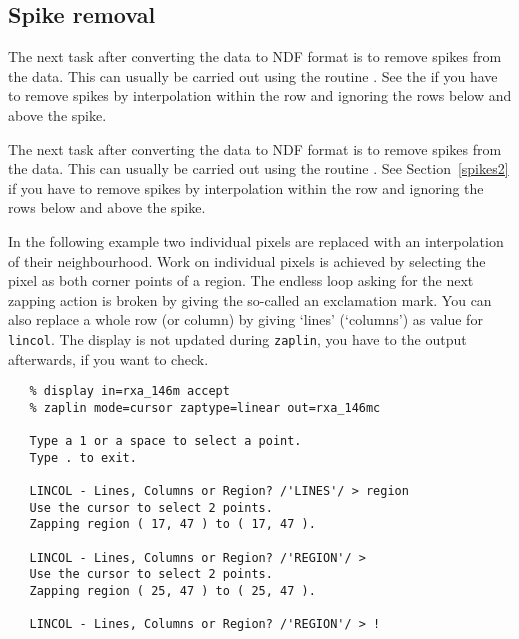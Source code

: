 \subsection{\label{spikes}Spike removal}

\begin{htmlonly}
   The next task after converting the data to NDF format
   is to remove spikes from the data. This can usually
   be carried out using the routine
{\tt {}}.
   See the
   if you have to remove spikes by interpolation within the row and
   ignoring the rows below and above the spike.
\end{htmlonly}
\begin{latexonly}
   The next task after converting the data to NDF format
   is to remove spikes from the data. This can usually
   be carried out using the routine
{\tt {}}.
   See
Section~\ref{spikes2}
   if you have to remove spikes by interpolation within the row and
   ignoring the rows below and above the spike.
\end{latexonly}

   In the following example two individual pixels are replaced with an
   interpolation of their neighbourhood. Work on individual pixels is
   achieved by selecting the pixel as both corner points of a region.
   The endless loop asking for the next zapping action is broken by
   giving the so-called
   an exclamation mark. You can also
   replace a whole row (or column) by giving `lines' (`columns') as
   value for {\tt lincol}. The display is not updated during
   {\tt zaplin}, you
   have to
{\tt {}}
   the output afterwards, if you want to check.

\begin{verbatim}
   % display in=rxa_146m accept
   % zaplin mode=cursor zaptype=linear out=rxa_146mc

   Type a 1 or a space to select a point.
   Type . to exit.

   LINCOL - Lines, Columns or Region? /'LINES'/ > region
   Use the cursor to select 2 points.
   Zapping region ( 17, 47 ) to ( 17, 47 ).

   LINCOL - Lines, Columns or Region? /'REGION'/ >
   Use the cursor to select 2 points.
   Zapping region ( 25, 47 ) to ( 25, 47 ).

   LINCOL - Lines, Columns or Region? /'REGION'/ > !
\end{verbatim}


